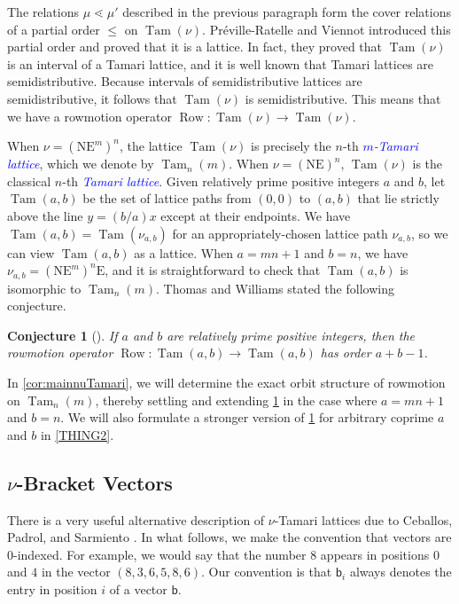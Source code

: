 \documentclass[11pt]{amsart}
\newtheorem{conjecture}[theorem]{Conjecture}
\theoremstyle{definition}
\DeclareMathOperator{\Tam}{Tam}
\DeclareMathOperator{\row}{Row}
\newcommand{\dfn}[1]{\textcolor{blue}{\emph{#1}}}
\begin{document}
The relations $\mu\lessdot\mu'$ described in the previous paragraph form the cover relations of a partial order $\leq$ on $\Tam(\nu)$. Pr\'eville-Ratelle and Viennot \cite{PrevilleViennot} introduced this partial order and proved that it is a lattice. In fact, they proved that $\Tam(\nu)$ is an interval of a Tamari lattice, and it is well known that Tamari lattices are semidistributive. Because intervals of semidistributive lattices are semidistributive, it follows that $\Tam(\nu)$ is semidistributive. This means that we have a rowmotion operator $\row\colon\Tam(\nu)\to\Tam(\nu)$. 

When $\nu=(\text{NE}^m)^n$, the lattice $\Tam(\nu)$ is precisely the $n$-th \dfn{$m$-Tamari lattice}, which we denote by $\Tam_n(m)$. When $\nu=(\text{NE})^n$, $\Tam(\nu)$ is the classical $n$-th \dfn{Tamari lattice}. Given relatively prime positive integers $a$ and $b$, let $\Tam(a,b)$ be the set of lattice paths from $(0,0)$ to $(a,b)$ that lie strictly above the line $y=(b/a)x$ except at their endpoints. We have $\Tam(a,b)=\Tam(\nu_{a,b})$ for an appropriately-chosen lattice path $\nu_{a,b}$, so we can view $\Tam(a,b)$ as a lattice. When $a=mn+1$ and $b=n$, we have $\nu_{a,b}=(\text{N}\text{E}^m)^n\text{E}$, and it is straightforward to check that $\Tam(a,b)$ is isomorphic to $\Tam_n(m)$. Thomas and Williams stated the following conjecture. 

\begin{conjecture}[\cite{ThomasWilliams}]\label{conj:ThomasWilliams}
If $a$ and $b$ are relatively prime positive integers, then the rowmotion operator $\row\colon\Tam(a,b)\to\Tam(a,b)$ has order $a+b-1$. 
\end{conjecture}

In \cref{cor:mainnuTamari}, we will determine the exact orbit structure of rowmotion on $\Tam_n(m)$, thereby settling and extending \cref{conj:ThomasWilliams} in the case where $a=mn+1$ and $b=n$. We will also formulate a stronger version of \cref{conj:ThomasWilliams} for arbitrary coprime $a$ and $b$ in \cref{THING2}.


\subsection{$\nu$-Bracket Vectors}

There is a very useful alternative description of $\nu$-Tamari lattices due to Ceballos, Padrol, and Sarmiento \cite{Ceballos2}. In what follows, we make the convention that vectors are $0$-indexed. For example, we would say that the number $8$ appears in positions $0$ and $4$ in the vector $(8,3,6,5,8,6)$. Our convention is that $\mathsf b_i$ always denotes the entry in position $i$ of a vector $\mathsf b$. 
\end{document}
